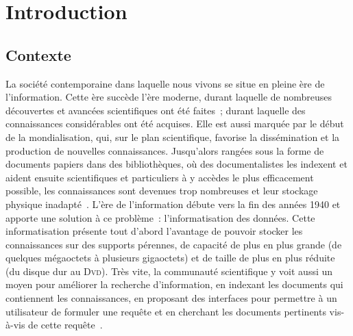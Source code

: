 \chapter{Introduction}
\label{chap:main-introduction}


  \section{Contexte}
  \label{sec:main-introduction-context}
    La société contemporaine dans laquelle nous vivons se situe en pleine ère de
    l'information. Cette ère succède l'ère moderne, durant laquelle de
    nombreuses découvertes et avancées scientifiques ont été faites~; durant
    laquelle des connaissances considérables ont été acquises. Elle  est aussi
    marquée par le début de la mondialisation, qui, sur le plan scientifique,
    favorise la dissémination et la production de nouvelles connaissances.
    Jusqu'alors rangées sous la forme de documents papiers dans des
    bibliothèques, où des documentalistes les indexent et aident ensuite
    scientifiques et particuliers à y accèdes le plus efficacement possible, les
    connaissances sont devenues trop nombreuses et leur stockage physique
    inadapté~\cite{rider1946thegreatdilemmaofworldorganization}. L'ère de
    l'information débute vers la fin des années 1940 et apporte une solution à
    ce problème~: l'informatisation des données. Cette informatisation présente
    tout d'abord l'avantage de pouvoir stocker les connaissances sur des
    supports pérennes, de capacité de plus en plus grande (de quelques
    mégaoctets à plusieurs gigaoctets) et de taille de plus en plus réduite (du
    disque dur au \textsc{Dvd}). Très vite, la communauté scientifique y voit
    aussi un moyen pour améliorer la recherche d'information, en indexant les
    documents qui contiennent les connaissances, en proposant des interfaces
    pour permettre à un utilisateur de formuler une requête et en cherchant les
    documents pertinents vis-à-vis de cette requête~\cite{salton1975tfidf}.

